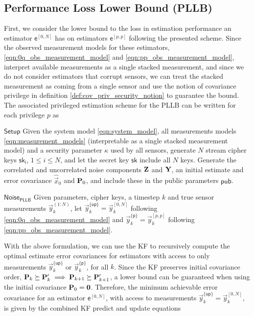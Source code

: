 \documentclass[letterpaper, 10 pt, conference]{ieeeconf}
\begin{document}
\subsection{Performance Loss Lower Bound (PLLB)}\label{subsec:crypto_performance_loss_lower_bound}
First, we consider the lower bound to the loss in estimation performance an estimator $\mathsf{e}^{[0,N]}$ has on estimators $\mathsf{e}^{[p,p]}$ following the presented scheme. Since the observed measurement models for these estimators, \eqref{eqn:0q_obs_measurement_model} and \eqref{eqn:pp_obs_measurement_model}, interpret available measurements as a single stacked measurement, and since we do not consider estimators that corrupt sensors, we can treat the stacked measurement as coming from a single sensor and use the notion of covariance privilege in definition \ref{def:cov_priv_security_notion} to guarantee the bound. The associated privileged estimation scheme for the PLLB can be written for each privilege $p$ as
\begin{LaTeXdescription}
  \item[$\mathsf{Setup}$] Given the system model \eqref{eqn:system_model}, all measurements models \eqref{eqn:measurement_models} (interpretable as a single stacked measurement model) and a security parameter $\kappa$ used by all sensors, generate $N$ stream cipher keys $\mathsf{sk_i}$, $1\leq i \leq N$, and let the secret key $\mathsf{sk}$ include all $N$ keys. Generate the correlated and uncorrelated noise components ${{\mathbf{Z}}}$ and ${{\mathbf{Y}}}$, an initial estimate and error covariance $\hat{\vec{x}}_0$ and ${{\mathbf{P}}}_0$, and include these in the public parameters $\mathsf{pub}$.
  
  \item[$\mathsf{Noise}_{\mathsf{PLLB}}$] Given parameters, cipher keys, a timestep $k$ and true sensor measurements $\vec{y}_k^{(1:N)}$, let $\vec{y}_k^{\{\mathsf{up}\}}=\vec{y}_k^{[0,N]}$ following \eqref{eqn:0q_obs_measurement_model} and $\vec{y}_k^{\{\mathsf{p}\}}=\vec{y}_k^{[p,p]}$ following \eqref{eqn:pp_obs_measurement_model}.
\end{LaTeXdescription}
With the above formulation, we can use the KF to recursively compute the optimal estimate error covariances for estimators with access to only measurements $\vec{y}_k^{\{\mathsf{up}\}}$ or $\vec{y}_k^{\{\mathsf{p}\}}$, for all $k$. Since the KF preserves initial covariance order, ${{\mathbf{P}}}_k \succeq {\ensuremath{{\mathbf{P}}}}_k^\prime \implies {\ensuremath{{\mathbf{P}}}}_{k+1} \succeq {\ensuremath{{\mathbf{P}}}}_{k+1}^\prime$, a lower bound can be guaranteed when using the initial covariance ${{\mathbf{P}}}_0={{\mathbf{0}}}$. Therefore, the minimum achievable error covariance for an estimator $\mathsf{e}^{[0,N]}$, with access to measurements $\vec{y}_k^{\{\mathsf{up}\}}=\vec{y}_k^{[0,N]}$, is given by the combined KF predict and update equations
\end{document}
